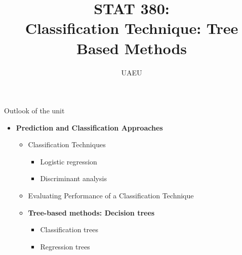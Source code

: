 \documentclass[compress]{beamer}
\title{  STAT 380:\\ {\color{black} Classification Technique:   Tree Based Methods}}
\author[UAEU]
{UAEU}
\institute[IIM] %
{
  \inst{}%
  \vspace{0.1in}

  
}
\date{}
\newcommand{\sqBullet}[1]{  {\tiny \tiny \tiny \qBoxCol{#1!60}{ }} }
\begin{document}
\maketitle





\begin{frame}{Outlook of the unit}
	
	\begin{itemize}
		\item \textbf{Prediction and Classification Approaches}
		\vspace{0.2cm}
	\begin{itemize}

		\item Classification Techniques
			\begin{itemize}
			\item Logistic regression
				\vspace{0.2cm}
			\item Discriminant analysis
					\end{itemize}
			\vspace{0.2cm}
			\item { Evaluating  Performance of a Classification Technique}
				\vspace{0.2cm}
			\item {\bf  \color{airforceblue} Tree-based methods: Decision trees}
				\vspace{0.2cm}
				\begin{itemize}
				\item Classification trees
				\vspace{0.2cm}
				\item
				Regression trees
	\end{itemize}
		\end{itemize}
		\end{itemize}		
\end{frame}


%
%	
%	
%		
\end{document}
